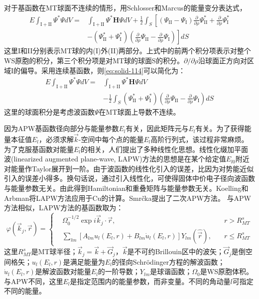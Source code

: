 对于基函数在MT球面不连续的情形，用Schlosser和Marcus的能量变分表达式\cite{PR131-2529_1963}，
\begin{equation}
  \begin{split}
    E\int_{\mathrm{I+II}}\Psi^{\ast}\Psi dV=&\int_{\mathrm{I+II}}\Psi^{\ast}\mathbf H\Psi dV+\frac12\int_S\left[(\Psi_{\mathrm{II}}-\Psi_{\mathrm I})\frac{\partial}{\partial\rho}\Psi_{\mathrm {II}}^{\ast}+\frac{\partial}{\partial\rho}\Psi_{\mathrm I}^{\ast}\right.\\
    &-(\Psi_{\mathrm {II}}^{\ast}+\Psi_{\mathrm I}^{\ast})\left.\left(\frac{\partial}{\partial\rho}\Psi_{\mathrm{II}}-\frac{\partial}{\partial\rho}\Psi_{\mathrm I}\right)\right]dS
  \end{split}
  \label{eq:solid-114}
\end{equation}
这里I和II分别表示MT球的内(I)外(II)两部分。上式中的前两个积分项表示对整个WS原胞的积分，第三个积分项是对MT球的球面S的积分。$\partial/\partial\rho$沿球面正方向对区域I的偏导。采用连续基函数，则\eqref{eq:solid-114}可以简化为：
\begin{equation}
  \begin{split}
    E\int_{\mathrm{I+II}}\Psi^{\ast}\Psi dV=&\int_{\mathrm{I+II}}\Psi^{\ast}\mathbf H\Psi dV\\
    &-\frac12\int_S(\Psi_{\mathrm {II}}^{\ast}+\Psi_{\mathrm I}^{\ast})\left(\frac{\partial}{\partial\rho}\Psi_{\mathrm{II}}-\frac{\partial}{\partial\rho}\Psi_{\mathrm I}\right)dS
  \end{split}
  \label{eq:solid-115}
\end{equation}
这里的球面积分是考虑波函数$\Psi$在MT球面上导数不连续。

因为APW基函数径向部分与能量参数$E_l$有关，因此矩阵元与$E_l$有关。为了获得能量本征值$E_l$，必须求解$\vec k$-空间中每个点的能量$E_l$高阶行列式，该过程非常麻烦。为了克服基函数对能量$E_l$的相关，人们提出了多种线性化思想\cite{PRB2-3098_1970,PRB2-290_1970,JPF9-661_1979,PRB19-6094_1979}。线性化缀加平面波(linearized augmented plane-wave, LAPW)方法的思想是在某个给定值$E_{l0}$附近对能量作Taylor展开到一阶\cite{PRB12-3060_1975}。由于波函数的线性化引入的误差，比因为对势能近似引入的误差小得多。换句话说，通过引入线性化，可使得固体中价电子径向波函数与能量参数无关。由此得到Hamiltonian和重叠矩阵与能量参数无关。Koelling和Arbman将LAPW方法应用于Cu的计算\cite{JPF5-2041_1975}。Smr\v cka提出了二次APW方法\cite{Smrcka}。
与APW方法相似，LAPW方法的基函数取为：
\begin{equation}
  \varphi(\vec k_j,\vec r)=\left\{
  \begin{aligned}
    &\Omega_0^{-1/2}\exp{i\vec k_j\cdot\vec r},&r>R_{MT}^s\\
    &\sum_{lm}[A_{lm}u_l(E_l,r)+B_{lm}\dot u_l(E_l,r)]Y_{lm}(\hat{\vec r}),\quad&r\leqslant R_{MT}^s
  \end{aligned}\right.
  \label{eq:LAPW-basis}
\end{equation}
这里$R_{MT}^s$是MT球半径；$\vec k_j=\vec k+\vec G_j$，$\vec k$是不可约Brillouin区中的波矢；$\vec G_j$是倒空间格矢；$u_l(E_l,r)$是满足能量为$E_l$的径向Schr\"odinger方程的解波函数；$\dot u_l(E_l,r)$是解波函数对能量$E_l$的一阶导数；$Y_{lm}$是球谐函数；$\Omega_0$是WS原胞体积。与APW不同，这里$E_l$是指定范围内的能量参数，而非变量。不同的角动量$l$可指定不同的能量。

